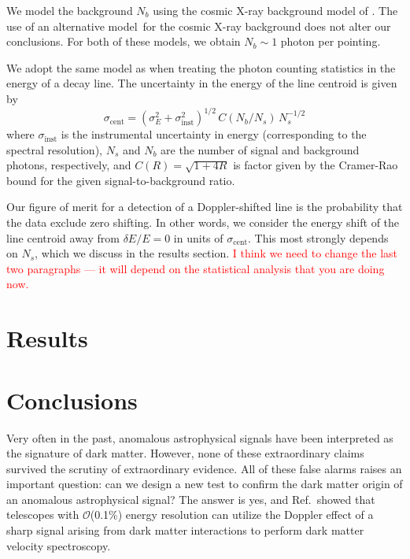 \documentclass[aps,prd,10pt,twocolumn,superscriptaddress,showpacs]{revtex4-1}
\begin{document}
We model the background $N_b$ using the cosmic X-ray background model of \cite{Ajello:2008xb}.  The use of an alternative model\,\cite{Hickox:2005dz} for the cosmic X-ray background does not alter our conclusions.  For both of these models, we obtain $N_b \sim 1$ photon per pointing. 

We adopt the same model as \cite{speckhard2016} when treating the photon counting statistics in the
energy of a decay line. The uncertainty in the energy of the line centroid is given by
\begin{equation} 
	\sigma_\mathrm{cent} = (\sigma_E^2 + \sigma_\mathrm{inst}^2)^{1/2} \, C(N_b/N_s) \, N_s^{-1/2}
\label{eq:stats}
\end{equation}
where $\sigma_\mathrm{inst}$ is the instrumental uncertainty in energy (corresponding to the spectral
resolution), $N_s$ and $N_b$ are the number of signal and background photons, respectively, and
$C(R)=\sqrt{1+4R}$ is factor given by the Cramer-Rao bound for the given signal-to-background ratio.

Our figure of merit for a detection of a Doppler-shifted line is the probability that the data
exclude zero shifting. In other words, we consider the energy shift of the line centroid
away from $\delta E/E=0$ in units of $\sigma_\mathrm{cent}$. This most strongly depends on $N_s$,
which we discuss in the results section.  \textcolor{red}  {I think we need to change the last two paragraphs --- it will depend on the statistical analysis that you are doing now. }


\section{Results}
\label{sec:results}



\section{Conclusions}
\label{sec:conclusions}

Very often in the past, anomalous astrophysical signals have been interpreted as the signature of dark matter.  However, none of these extraordinary claims survived the scrutiny of extraordinary evidence.  All of these false alarms raises an important question:  can we design a new test to confirm the dark matter origin of an anomalous astrophysical signal?  The answer is yes, and Ref.\,\cite{speckhard2016} showed that telescopes with $\mathcal{O}$(0.1\%) energy resolution can utilize the Doppler effect of a sharp signal arising from dark matter interactions to perform dark matter velocity spectroscopy.
\end{document}
